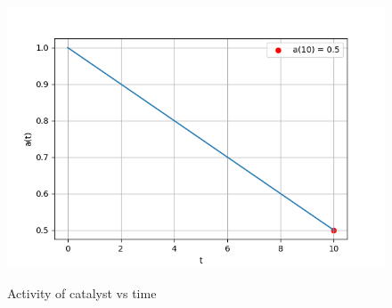 \documentclass[journal,12pt,twocolumn]{IEEEtran}
\theoremstyle{remark}
\begin{document}
\begin{figure}[h!]
\centering
\includegraphics[width=\columnwidth]{figs/gate_plot.png}
\label{fig:plot}
\caption{Activity of catalyst vs time }
\end{figure}
\end{document}
